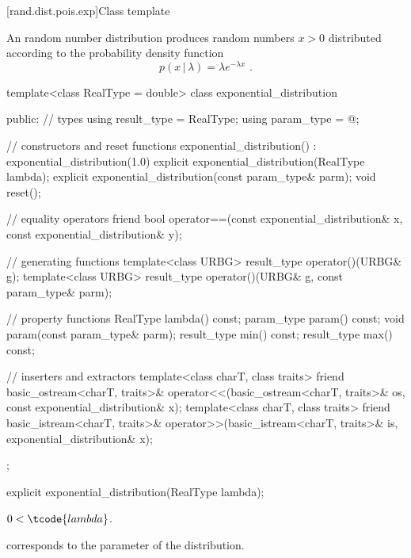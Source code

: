 
[rand.dist.pois.exp]{Class template }%
%

\pnum
An  random number distribution
produces random numbers $x > 0$
distributed according to
the probability density function%
\[ p(x\,|\,\lambda) = \lambda e^{-\lambda x} \text{ .} \]

%
%
\begin{codeblock}
template<class RealType = double>
  class exponential_distribution {
  public:
    // types
    using result_type = RealType;
    using param_type  = @\unspec@;

    // constructors and reset functions
    exponential_distribution() : exponential_distribution(1.0) {}
    explicit exponential_distribution(RealType lambda);
    explicit exponential_distribution(const param_type& parm);
    void reset();

    // equality operators
    friend bool operator==(const exponential_distribution& x, const exponential_distribution& y);

    // generating functions
    template<class URBG>
      result_type operator()(URBG& g);
    template<class URBG>
      result_type operator()(URBG& g, const param_type& parm);

    // property functions
    RealType lambda() const;
    param_type param() const;
    void param(const param_type& parm);
    result_type min() const;
    result_type max() const;

    // inserters and extractors
    template<class charT, class traits>
      friend basic_ostream<charT, traits>&
        operator<<(basic_ostream<charT, traits>& os, const exponential_distribution& x);
    template<class charT, class traits>
      friend basic_istream<charT, traits>&
        operator>>(basic_istream<charT, traits>& is, exponential_distribution& x);
  };
\end{codeblock}


%
\begin{itemdecl}
explicit exponential_distribution(RealType lambda);
\end{itemdecl}

\begin{itemdescr}
\pnum
\expects
$0 < \tcode{lambda}$.

\pnum
\remarks
{} corresponds to the parameter of the distribution.
\end{itemdescr}

